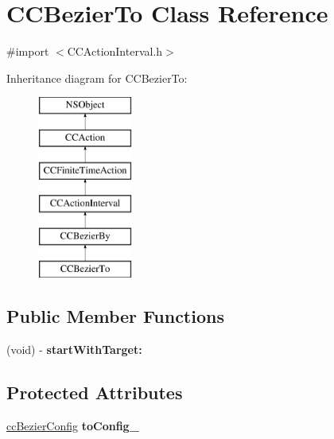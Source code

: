 \hypertarget{interface_c_c_bezier_to}{\section{C\-C\-Bezier\-To Class Reference}
\label{interface_c_c_bezier_to}
}


{\ttfamily \#import $<$C\-C\-Action\-Interval.\-h$>$}

Inheritance diagram for C\-C\-Bezier\-To\-:\begin{figure}[H]
\begin{center}
\leavevmode
\includegraphics[height=6.000000cm]{interface_c_c_bezier_to}
\end{center}
\end{figure}
\subsection*{Public Member Functions}
\begin{DoxyCompactItemize}
\item 
\hypertarget{interface_c_c_bezier_to_a8ae84129b956a5f87865246585282d6e}{(void) -\/ {\bfseries start\-With\-Target\-:}}\label{interface_c_c_bezier_to_a8ae84129b956a5f87865246585282d6e}

\end{DoxyCompactItemize}
\subsection*{Protected Attributes}
\begin{DoxyCompactItemize}
\item 
\hypertarget{interface_c_c_bezier_to_abee792c40b0eeb0a088e3fe2583fa0d3}{\hyperlink{struct__cc_bezier_config}{cc\-Bezier\-Config} {\bfseries to\-Config\-\_\-}}\label{interface_c_c_bezier_to_abee792c40b0eeb0a088e3fe2583fa0d3}

\end{DoxyCompactItemize}


